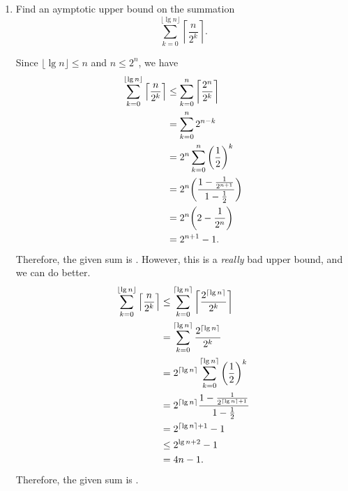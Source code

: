\documentclass[AppendixA]{subfiles}
\begin{document}
\begin{enumerate}
		\item Find an aymptotic upper bound on the summation
		\[
			\sum_{k = 0}^{\lfloor \lg n \rfloor} \left\lceil \frac{n}{2^k} \right\rceil.
		\]
		\begin{answer}
			Since $\lfloor \lg n \rfloor \leq n$ and $n \leq 2^n$, we have
			\begin{align*}
				\sum_{k = 0}^{\lfloor \lg n \rfloor} \left\lceil \frac{n}{2^k} \right\rceil &\leq \sum_{k = 0}^n \left\lceil \frac{2^n}{2^k} \right\rceil\\
					&= \sum_{k = 0}^n 2^{n - k}\\
					&= 2^n \sum_{k = 0}^n \qty(\frac{1}{2})^k\\
					&= 2^n \qty(\frac{1 - \frac{1}{2^{n + 1}}}{1 - \frac{1}{2}})\\
					&= 2^n \qty(2 - \frac{1}{2^{n}})\\
					&= 2^{n + 1} - 1.
			\end{align*}
			Therefore, the given sum is . However, this is a \emph{really} bad upper bound, and we can do better.
			\begin{align*}
				\sum_{k = 0}^{\lfloor \lg n \rfloor} \left\lceil \frac{n}{2^k} \right\rceil &\leq \sum_{k = 0}^{\lceil \lg n \rceil} \left\lceil \frac{2^{\lceil \lg n \rceil}}{2^k} \right\rceil\\
					&= \sum_{k = 0}^{\lceil \lg n \rceil} \frac{2^{\lceil \lg n \rceil}}{2^k}\\
					&= 2^{\lceil \lg n \rceil} \sum_{k = 0}^{\lceil \lg n \rceil} \qty(\frac{1}{2})^k\\
					&= 2^{\lceil \lg n \rceil} \frac{1 - \frac{1}{2^{\lceil \lg n \rceil + 1}}}{1 - \frac{1}{2}}\\
					&= 2^{\lceil \lg n \rceil + 1} - 1\\
					&\leq 2^{\lg n + 2} - 1\\
					&= 4n - 1.
			\end{align*}
			Therefore, the given sum is .
		\end{answer}
		

\end{enumerate}
\end{document}
